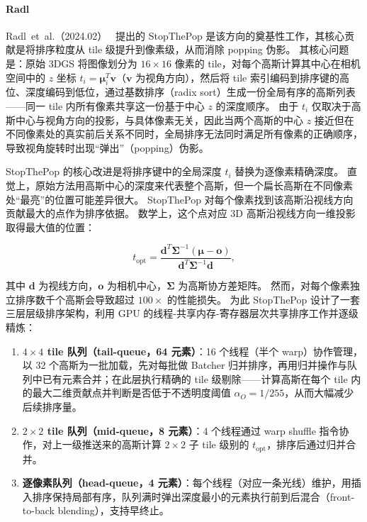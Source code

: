 \paragraph{Radl}
Radl~et~al.（2024.02）~\cite{2402_00525} 提出的 StopThePop 是该方向的奠基性工作，其核心贡献是将排序粒度从 tile 级提升到像素级，从而消除 popping 伪影。
其核心问题是：原始 3DGS 将图像划分为 $16\!\times\!16$ 像素的 tile，对每个高斯计算其中心在相机空间中的 $z$ 坐标 $t_i = \boldsymbol{\mu}_i^T \mathbf{v}$（$\mathbf{v}$ 为视角方向），然后将 tile 索引编码到排序键的高位、深度编码到低位，通过基数排序（radix sort）生成一份全局有序的高斯列表——同一 tile 内所有像素共享这一份基于中心 $z$ 的深度顺序。
由于 $t_i$ 仅取决于高斯中心与视角方向的投影，与具体像素无关，因此当两个高斯的中心 $z$ 接近但在不同像素处的真实前后关系不同时，全局排序无法同时满足所有像素的正确顺序，导致视角旋转时出现“弹出”（popping）伪影。

StopThePop 的核心改进是将排序键中的全局深度 $t_i$ 替换为逐像素精确深度。
直觉上，原始方法用高斯中心的深度来代表整个高斯，但一个扁长高斯在不同像素处“最亮”的位置可能差异很大。
StopThePop 对每个像素找到该高斯沿视线方向贡献最大的点作为排序依据。
数学上，这个点对应 3D 高斯沿视线方向一维投影取得最大值的位置：

\[
t_{\mathrm{opt}} = \frac{\mathbf{d}^T\boldsymbol{\Sigma}^{-1}(\boldsymbol{\mu} - \mathbf{o})}{\mathbf{d}^T\boldsymbol{\Sigma}^{-1}\mathbf{d}},
\]

其中 $\mathbf{d}$ 为视线方向，$\mathbf{o}$ 为相机中心，$\boldsymbol{\Sigma}$ 为高斯协方差矩阵。
然而，对每个像素独立排序数千个高斯会导致超过 $100\times$ 的性能损失。
为此 StopThePop 设计了一套三层层级排序架构，利用 GPU 的线程-共享内存-寄存器层次共享排序工作并逐级精炼：

\begin{enumerate}
  \item \textbf{$4\!\times\!4$ tile 队列（tail-queue，64 元素）}：16 个线程（半个 warp）协作管理，以 32 个高斯为一批加载，先对每批做 Batcher 归并排序，再用归并操作与队列中已有元素合并；在此层执行精确的 tile 级剔除——计算高斯在每个 tile 内的最大二维贡献点并判断是否低于不透明度阈值 $\alpha_O = 1/255$，从而大幅减少后续排序量。
  \item \textbf{$2\!\times\!2$ tile 队列（mid-queue，8 元素）}：4 个线程通过 warp shuffle 指令协作，对上一级推送来的高斯计算 $2\!\times\!2$ 子 tile 级别的 $t_{\mathrm{opt}}$，排序后通过归并合并。
  \item \textbf{逐像素队列（head-queue，4 元素）}：每个线程（对应一条光线）维护，用插入排序保持局部有序，队列满时弹出深度最小的元素执行前到后混合（front-to-back blending），支持早终止。
\end{enumerate}

